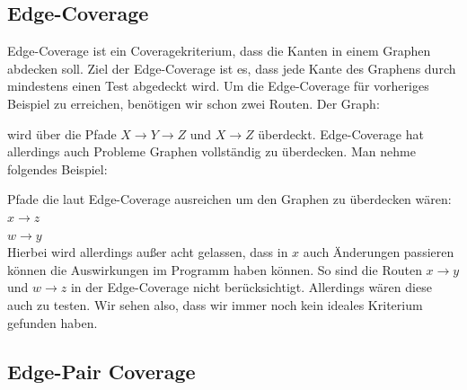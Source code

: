 \subsection{Edge-Coverage}

Edge-Coverage ist ein Coveragekriterium, dass die Kanten in einem Graphen abdecken soll.
Ziel der Edge-Coverage ist es, dass jede Kante des Graphens durch mindestens einen Test abgedeckt wird.
Um die Edge-Coverage für vorheriges Beispiel zu erreichen, benötigen wir schon zwei Routen.
Der Graph:


wird über die Pfade $X \rightarrow Y \rightarrow Z$ und $X \rightarrow Z$ überdeckt.
Edge-Coverage hat allerdings auch Probleme Graphen vollständig zu überdecken.
Man nehme folgendes Beispiel:


Pfade die laut Edge-Coverage ausreichen um den Graphen zu überdecken wären: \\
$ x \rightarrow z $ \\
$ w \rightarrow y $ \\
Hierbei wird allerdings außer acht gelassen, dass in $x$ auch Änderungen passieren können die Auswirkungen im Programm haben können.
So sind die Routen $ x \rightarrow y $ und $ w \rightarrow z $ in der Edge-Coverage nicht berücksichtigt.
Allerdings wären diese auch zu testen.
Wir sehen also, dass wir immer noch kein ideales Kriterium gefunden haben.


\subsection{Edge-Pair Coverage}

